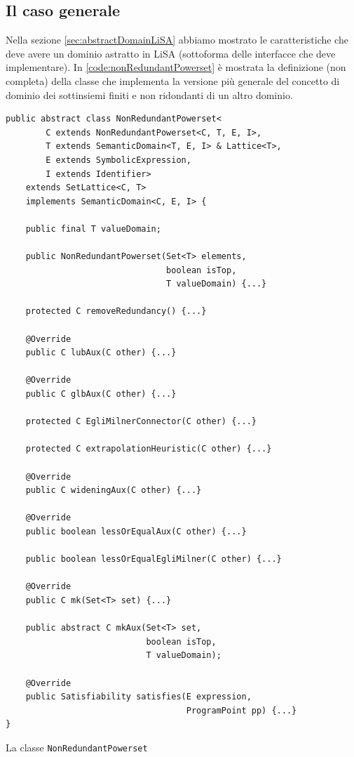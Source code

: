 \subsection{Il caso generale}

Nella sezione \ref{sec:abstractDomainLiSA} abbiamo mostrato le caratteristiche che deve avere un dominio astratto in LiSA (sottoforma delle interfacce che deve implementare). In \ref{code:nonRedundantPowerset} è mostrata la definizione (non completa) della classe che implementa la versione più generale del concetto di dominio dei sottinsiemi finiti e non ridondanti di un altro dominio.
\begin{algorithm}
\lstset{frame=none}
\begin{lstlisting}[belowskip=-1.1 \baselineskip]
public abstract class NonRedundantPowerset<
        C extends NonRedundantPowerset<C, T, E, I>,
        T extends SemanticDomain<T, E, I> & Lattice<T>,
        E extends SymbolicExpression,
        I extends Identifier> 
    extends SetLattice<C, T> 
    implements SemanticDomain<C, E, I> {

    public final T valueDomain;
    
    public NonRedundantPowerset(Set<T> elements, 
                                boolean isTop, 
                                T valueDomain) {...}
    
    protected C removeRedundancy() {...}
    
    @Override
    public C lubAux(C other) {...}
    
    @Override
    public C glbAux(C other) {...}
    
    protected C EgliMilnerConnector(C other) {...}
    
    protected C extrapolationHeuristic(C other) {...}
    
    @Override
    public C wideningAux(C other) {...}
    
    @Override
    public boolean lessOrEqualAux(C other) {...}
    
    public boolean lessOrEqualEgliMilner(C other) {...}
    
    @Override
    public C mk(Set<T> set) {...}
    
    public abstract C mkAux(Set<T> set, 
                            boolean isTop, 
                            T valueDomain);
    
    @Override
    public Satisfiability satisfies(E expression, 
                                    ProgramPoint pp) {...}
}
\end{lstlisting}
\caption{La classe \texttt{NonRedundantPowerset}}
\label{code:nonRedundantPowerset}
\end{algorithm}
